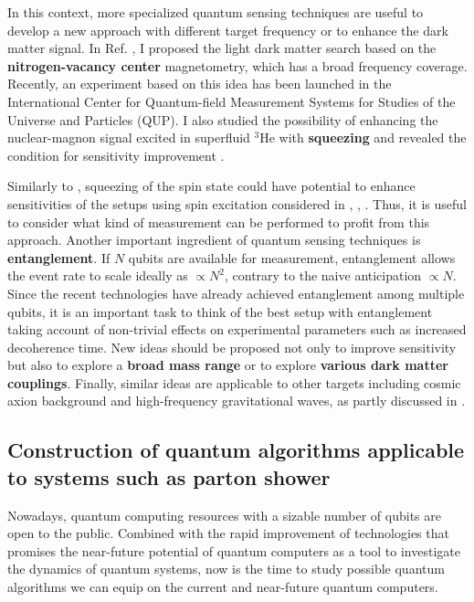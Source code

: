 \documentclass[12pt]{article}
\begin{document}
In this context, more specialized quantum sensing techniques are useful to develop a new approach with different target frequency or to enhance the dark matter signal.
In Ref. \cite{Chigusa:2023hms}, I proposed the light dark matter search based on the \textbf{nitrogen-vacancy center} magnetometry, which has a broad frequency coverage.
Recently, an experiment based on this idea has been launched in the International Center for Quantum-field Measurement Systems for Studies of the Universe and Particles (QUP).
I also studied the possibility of enhancing the nuclear-magnon signal excited in superfluid $\mathrm{^3He}$ with \textbf{squeezing} and revealed the condition for sensitivity improvement \cite{Chigusa:2023szl}.

Similarly to \cite{Chigusa:2023szl}, squeezing of the spin state could have potential to enhance sensitivities of the setups using spin excitation considered in \cite{Chigusa:2020gfs}, \cite{Chigusa:2021mci}, \cite{Chigusa:2023hmz}.
Thus, it is useful to consider what kind of measurement can be performed to profit from this approach.
Another important ingredient of quantum sensing techniques is \textbf{entanglement}.
If $N$ qubits are available for measurement, entanglement allows the event rate to scale ideally as $\propto N^2$, contrary to the naive anticipation $\propto N$.
Since the recent technologies have already achieved entanglement among multiple qubits, it is an important task to think of the best setup with entanglement taking account of non-trivial effects on experimental parameters such as increased decoherence time.
New ideas should be proposed not only to improve sensitivity but also to explore a \textbf{broad mass range} or to explore \textbf{various dark matter couplings}.
Finally, similar ideas are applicable to other targets including cosmic axion background and high-frequency gravitational waves, as partly discussed in \cite{Chigusa:2023bga}.

\subsection*{Construction of quantum algorithms applicable to systems such as parton shower}

Nowadays, quantum computing resources with a sizable number of qubits are open to the public.
Combined with the rapid improvement of technologies that promises the near-future potential of quantum computers as a tool to investigate the dynamics of quantum systems, now is the time to study possible quantum algorithms we can equip on the current and near-future quantum computers.
\end{document}
